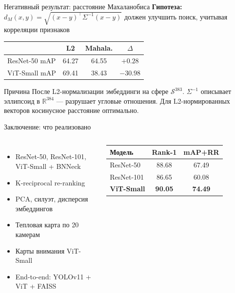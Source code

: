 \documentclass[aspectratio=169,12pt]{beamer}
\begin{document}
\begin{frame}{Негативный результат: расстояние Махаланобиса}
  \textbf{Гипотеза:} $d_M(x,y) = \sqrt{(x-y)^\top\Sigma^{-1}(x-y)}$ должен улучшить поиск, учитывая корреляции признаков
  \vspace{0.5em}
  \begin{center}
  \renewcommand{\arraystretch}{1.4}
  \begin{tabular}{lccc}
    \toprule
    & \textbf{L2} & \textbf{Mahala.} & $\Delta$ \\
    \midrule
    ResNet-50 mAP & 64.27 & 64.55 & $+0.28$ \\
    ViT-Small mAP  & 69.41 & 38.43 & \textcolor{bad}{$\mathbf{-30.98}$} \\
    \bottomrule
  \end{tabular}
  \end{center}
  \vspace{0.5em}
  \begin{alertblock}{Причина}
    \small
    После L2-нормализации эмбеддинги на сфере $\mathcal{S}^{383}$.
    $\Sigma^{-1}$ описывает эллипсоид в $\mathbb{R}^{384}$ --- разрушает угловые отношения.
    Для L2-нормированных векторов косинусное расстояние оптимально.
  \end{alertblock}
\end{frame}

\begin{frame}{Заключение: что реализовано}
  \begin{columns}[T,onlytextwidth]
    \begin{itemize}\setlength{\itemsep}{6pt}
      \item ResNet-50, ResNet-101, ViT-Small + BNNeck
      \item K-reciprocal re-ranking
      \item PCA, силуэт, дисперсия эмбеддингов
      \item Тепловая карта по 20 камерам
      \item Карты внимания ViT-Small
      \item End-to-end: YOLOv11 + ViT + FAISS
    \end{itemize}
    \renewcommand{\arraystretch}{1.3}
    \begin{tabular}{lcc}
      \toprule
      \textbf{Модель} & \textbf{Rank-1} & \textbf{mAP+RR} \\
      \midrule
      ResNet-50 & 88.68 & 67.49 \\
      ResNet-101 & 86.65 & 60.08 \\
      \rowcolor{rowhl}\textbf{ViT-Small} & \textbf{90.05} & \textbf{74.49} \\
      \bottomrule
    \end{tabular}
  \end{columns}
\end{frame}
\end{document}
